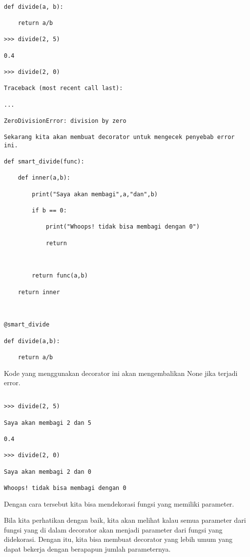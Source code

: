 \documentclass[12pt,a4paper]{article}
\begin{document}
\begin{verbatim}

def divide(a, b):

    return a/b

>>> divide(2, 5)

0.4

>>> divide(2, 0)

Traceback (most recent call last):

...

ZeroDivisionError: division by zero

Sekarang kita akan membuat decorator untuk mengecek penyebab error ini.

def smart_divide(func):

    def inner(a,b):

        print("Saya akan membagi",a,"dan",b)

        if b == 0:

            print("Whoops! tidak bisa membagi dengan 0")

            return



        return func(a,b)

    return inner



@smart_divide

def divide(a,b):

    return a/b

\end{verbatim}



Kode yang menggunakan decorator ini akan mengembalikan None jika terjadi error.

\begin{verbatim}

>>> divide(2, 5)

Saya akan membagi 2 dan 5

0.4

>>> divide(2, 0)

Saya akan membagi 2 dan 0

Whoops! tidak bisa membagi dengan 0

\end{verbatim}



Dengan cara tersebut kita bisa mendekorasi fungsi yang memiliki parameter.

Bila kita perhatikan dengan baik, kita akan melihat kalau semua parameter dari fungsi yang di dalam decorator akan menjadi parameter dari fungsi yang didekorasi. Dengan itu, kita bisa membuat decorator yang lebih umum yang dapat bekerja dengan berapapun jumlah parameternya.
\end{document}
